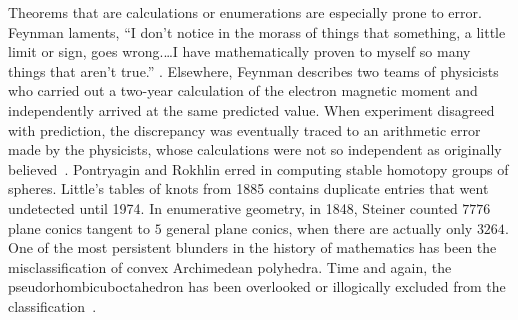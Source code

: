 \documentclass{llncs}
\begin{document}

Theorems that are calculations or enumerations are especially prone to
error.  Feynman laments, ``I don't notice in the morass of things that something, a
little limit or sign, goes wrong.\dots I have mathematically proven to myself
so many things that aren't true.''
\cite[p.~885]{FeCo}. Elsewhere, Feynman describes two teams of
physicists who carried out a two-year calculation of the electron
magnetic moment and independently arrived at the same predicted value.
When experiment disagreed with prediction, the discrepancy
was eventually traced to an arithmetic error made by the physicists,
whose calculations were not so independent as originally
believed~\cite[p.~117]{FQED}.  Pontryagin and Rokhlin erred in computing stable
homotopy groups of spheres.  Little's tables of knots from 1885
contains duplicate entries that went undetected until 1974.  In
enumerative geometry, in 1848, Steiner counted $7776$ plane conics
tangent to $5$ general plane conics, when there are actually only
$3264$.  One of the most persistent blunders in the history of mathematics
has been the misclassification of convex Archimedean polyhedra.  Time and again,
the pseudorhombicuboctahedron has been overlooked or illogically excluded from
the classification~\cite{Gr11}.








\end{document}
